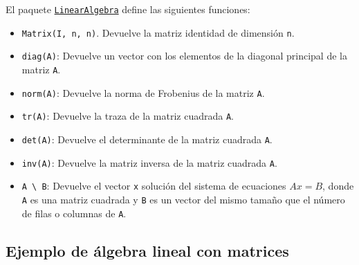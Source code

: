 \documentclass[
  letterpaper,
  DIV=11,
  numbers=noendperiod]{scrreprt}
\providecommand{\tightlist}{%
  \setlength{\itemsep}{0pt}\setlength{\parskip}{0pt}}\usepackage{longtable,booktabs,array}
\begin{document}
El paquete
\href{https://docs.julialang.org/en/v1/stdlib/LinearAlgebra/}{\texttt{LinearAlgebra}}
define las siguientes funciones:

\begin{itemize}
\tightlist
\item
  \texttt{Matrix(I,\ n,\ n)}. Devuelve la matriz identidad de dimensión
  \texttt{n}.
\item
  \texttt{diag(A)}: Devuelve un vector con los elementos de la diagonal
  principal de la matriz \texttt{A}.
\item
  \texttt{norm(A)}: Devuelve la norma de Frobenius de la matriz
  \texttt{A}.
\item
  \texttt{tr(A)}: Devuelve la traza de la matriz cuadrada \texttt{A}.
\item
  \texttt{det(A)}: Devuelve el determinante de la matriz cuadrada
  \texttt{A}.
\item
  \texttt{inv(A)}: Devuelve la matriz inversa de la matriz cuadrada
  \texttt{A}.
\item
  \texttt{A\ \textbackslash{}\ B}: Devuelve el vector \texttt{x}
  solución del sistema de ecuaciones \(Ax = B\), donde \texttt{A} es una
  matriz cuadrada y \texttt{B} es un vector del mismo tamaño que el
  número de filas o columnas de \texttt{A}.
\end{itemize}

\hypertarget{ejemplo-de-uxe1lgebra-lineal-con-matrices-1}{%
\subsection{Ejemplo de álgebra lineal con
matrices}\label{ejemplo-de-uxe1lgebra-lineal-con-matrices-1}}
\end{document}
